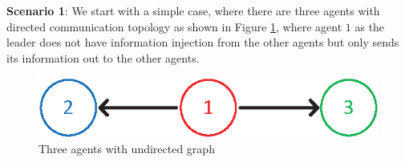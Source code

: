\documentclass[10pt,doublecolumn]{IEEEtran}  %
\begin{document}
\textbf{Scenario 1}: We start with a simple case, where there are three agents with directed communication topology as shown in Figure \ref{Formation3directed}, where agent $1$ as the leader does not have information injection from the other agents but only sends its information out to the other agents.
\begin{figure}[h!]
      \centering
      \includegraphics[scale=0.9]{Formation3directed.eps}
      \caption{Three agents with undirected graph}\label{Formation3directed}
\end{figure}
\end{document}
